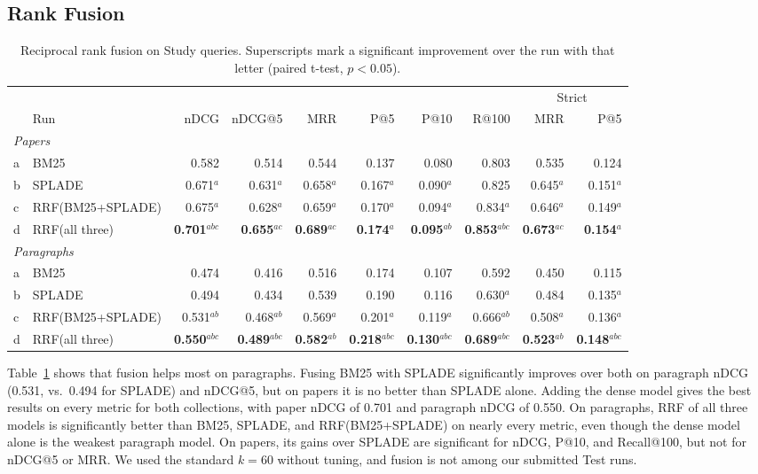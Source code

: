 \documentclass[sigconf,nonacm]{acmart}
\begin{document}
\subsection{Rank Fusion}
\label{sec:fusion-results}
\begin{table}[t]
  \caption{Reciprocal rank fusion on Study queries. Superscripts mark a
    significant improvement over the run with that letter
    (paired t-test, $p < 0.05$).}
  \label{tab:fusion}
  \small
  \begin{tabular}{llrrrrrrrr}
    \toprule
    & & & & & & & & \multicolumn{2}{c}{Strict} \\
    \cmidrule(lr){9-10}
    & Run & nDCG & nDCG@5 & MRR & P@5 & P@10 & R@100 & MRR & P@5 \\
    \midrule
    \multicolumn{10}{l}{\emph{Papers}} \\
    a & BM25        & 0.582 & 0.514 & 0.544 & 0.137 & 0.080 & 0.803 & 0.535 & 0.124 \\
    b & SPLADE      & 0.671$^{a}$ & 0.631$^{a}$ & 0.658$^{a}$ & 0.167$^{a}$ & 0.090$^{a}$ & 0.825 & 0.645$^{a}$ & 0.151$^{a}$ \\
    c & RRF(BM25+SPLADE) & 0.675$^{a}$ & 0.628$^{a}$ & 0.659$^{a}$ & 0.170$^{a}$ & 0.094$^{a}$ & 0.834$^{a}$ & 0.646$^{a}$ & 0.149$^{a}$ \\
    d & RRF(all three)   & \textbf{0.701}$^{abc}$ & \textbf{0.655}$^{ac}$ & \textbf{0.689}$^{ac}$ & \textbf{0.174}$^{a}$ & \textbf{0.095}$^{ab}$ & \textbf{0.853}$^{abc}$ & \textbf{0.673}$^{ac}$ & \textbf{0.154}$^{a}$ \\
    \midrule
    \multicolumn{10}{l}{\emph{Paragraphs}} \\
    a & BM25        & 0.474 & 0.416 & 0.516 & 0.174 & 0.107 & 0.592 & 0.450 & 0.115 \\
    b & SPLADE      & 0.494 & 0.434 & 0.539 & 0.190 & 0.116 & 0.630$^{a}$ & 0.484 & 0.135$^{a}$ \\
    c & RRF(BM25+SPLADE) & 0.531$^{ab}$ & 0.468$^{ab}$ & 0.569$^{a}$ & 0.201$^{a}$ & 0.119$^{a}$ & 0.666$^{ab}$ & 0.508$^{a}$ & 0.136$^{a}$ \\
    d & RRF(all three)   & \textbf{0.550}$^{abc}$ & \textbf{0.489}$^{abc}$ & \textbf{0.582}$^{ab}$ & \textbf{0.218}$^{abc}$ & \textbf{0.130}$^{abc}$ & \textbf{0.689}$^{abc}$ & \textbf{0.523}$^{ab}$ & \textbf{0.148}$^{abc}$ \\
    \bottomrule
  \end{tabular}
\end{table}

Table~\ref{tab:fusion} shows that fusion helps most on paragraphs. Fusing
BM25 with SPLADE significantly improves over both on paragraph nDCG
(0.531, vs.\ 0.494 for SPLADE) and nDCG@5, but on papers it is no better
than SPLADE alone. Adding the dense model gives the best results on every
metric for both collections, with paper nDCG of 0.701 and paragraph nDCG
of 0.550. On paragraphs, RRF of all three models is significantly better
than BM25, SPLADE, and RRF(BM25+SPLADE) on nearly every metric, even
though the dense model alone is the weakest paragraph model. On papers,
its gains over SPLADE are significant for nDCG, P@10, and Recall@100, but
not for nDCG@5 or MRR. We used the standard $k = 60$ without tuning, and
fusion is not among our submitted Test runs.
\end{document}
